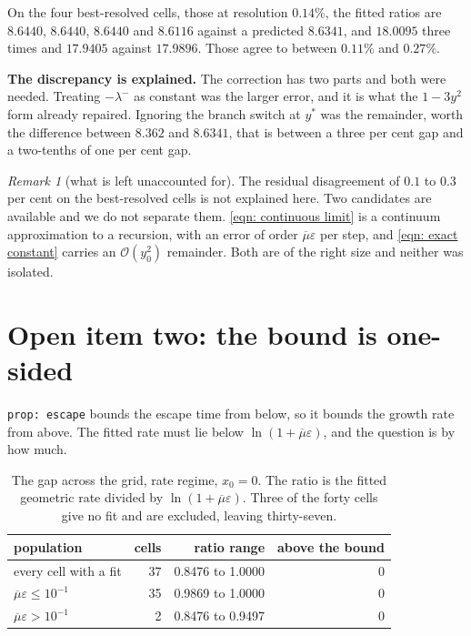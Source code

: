 \documentclass[11pt,a4paper]{article}
\providecommand{\calO}{{\mathcal{O}}}
\theoremstyle{definition}
\theoremstyle{remark}
\newtheorem{remark}{Remark}
\begin{document}
On the four best-resolved cells, those at resolution $0.14\%$, the fitted ratios
are $8.6440$, $8.6440$, $8.6440$ and $8.6116$ against a predicted $8.6341$, and
$18.0095$ three times and $17.9405$ against $17.9896$. Those agree to between
$0.11\%$ and $0.27\%$.

\textbf{The discrepancy is explained.} The correction has two parts and both were
needed. Treating $-\lambda^-$ as constant was the larger error, and it is what
the $1-3y^2$ form already repaired. Ignoring the branch switch at $y^\ast$ was
the remainder, worth the difference between $8.362$ and $8.6341$, that is between
a three per cent gap and a two-tenths of one per cent gap.

\begin{remark}[what is left unaccounted for]
  The residual disagreement of $0.1$ to $0.3$ per cent on the best-resolved cells
  is not explained here. Two candidates are available and we do not separate
  them. \eqref{eqn: continuous limit} is a continuum approximation to a
  recursion, with an error of order $\overline{\mu}\varepsilon$ per step, and
  \eqref{eqn: exact constant} carries an $\calO(y_0^2)$ remainder. Both are of
  the right size and neither was isolated.
\end{remark}

\section{Open item two: the bound is one-sided}\label{sec: open two}

\texttt{prop: escape} bounds the escape time from below, so it bounds the growth
rate from above. The fitted rate must lie below
$\ln(1+\overline{\mu}\varepsilon)$, and the question is by how much.

\begin{table}[H]
  \centering\small
  \caption{The gap across the grid, rate regime, $x_0 = 0$. The ratio is the
    fitted geometric rate divided by $\ln(1+\overline{\mu}\varepsilon)$. Three of
    the forty cells give no fit and are excluded, leaving thirty-seven.}
  \label{tab: gap}
  \begin{tabular}{lrrr}
    \toprule
    population & cells & ratio range & above the bound \\
    \midrule
    every cell with a fit                          & 37 & 0.8476 to 1.0000 & 0 \\
    $\overline{\mu}\varepsilon \leq 10^{-1}$       & 35 & 0.9869 to 1.0000 & 0 \\
    $\overline{\mu}\varepsilon > 10^{-1}$          &  2 & 0.8476 to 0.9497 & 0 \\
    \bottomrule
  \end{tabular}
\end{table}
\end{document}

